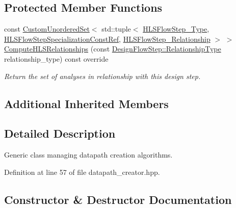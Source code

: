 \subsection*{Protected Member Functions}
\begin{DoxyCompactItemize}
\item 
const \hyperlink{classCustomUnorderedSet}{Custom\+Unordered\+Set}$<$ std\+::tuple$<$ \hyperlink{hls__step_8hpp_ada16bc22905016180e26fc7e39537f8d}{H\+L\+S\+Flow\+Step\+\_\+\+Type}, \hyperlink{hls__step_8hpp_a5fdd2edf290c196531d21d68e13f0e74}{H\+L\+S\+Flow\+Step\+Specialization\+Const\+Ref}, \hyperlink{hls__step_8hpp_a3ad360b9b11e6bf0683d5562a0ceb169}{H\+L\+S\+Flow\+Step\+\_\+\+Relationship} $>$ $>$ \hyperlink{classdatapath__creator_a7fb5e5ffd9ede6b14c718b9304a8f1dd}{Compute\+H\+L\+S\+Relationships} (const \hyperlink{classDesignFlowStep_a723a3baf19ff2ceb77bc13e099d0b1b7}{Design\+Flow\+Step\+::\+Relationship\+Type} relationship\+\_\+type) const override
\begin{DoxyCompactList}\small\item\em Return the set of analyses in relationship with this design step. \end{DoxyCompactList}\end{DoxyCompactItemize}
\subsection*{Additional Inherited Members}


\subsection{Detailed Description}
Generic class managing datapath creation algorithms. 

Definition at line 57 of file datapath\+\_\+creator.\+hpp.



\subsection{Constructor \& Destructor Documentation}
\mbox{\label{classdatapath__creator_a9dde5d77f557acd8ce5dc6efb11fb56e}} 
